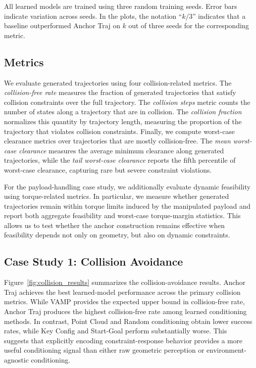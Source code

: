 All learned models are trained using three random training seeds. Error bars indicate variation across seeds. In the plots, the notation ``$k/3$'' indicates that a baseline outperformed Anchor Traj on $k$ out of three seeds for the corresponding metric.

\subsection{Metrics}

We evaluate generated trajectories using four collision-related metrics. The \textit{collision-free rate} measures the fraction of generated trajectories that satisfy collision constraints over the full trajectory. The \textit{collision steps} metric counts the number of states along a trajectory that are in collision. The \textit{collision fraction} normalizes this quantity by trajectory length, measuring the proportion of the trajectory that violates collision constraints. Finally, we compute worst-case clearance metrics over trajectories that are mostly collision-free. The \textit{mean worst-case clearance} measures the average minimum clearance along generated trajectories, while the \textit{tail worst-case clearance} reports the fifth percentile of worst-case clearance, capturing rare but severe constraint violations.

For the payload-handling case study, we additionally evaluate dynamic feasibility using torque-related metrics. In particular, we measure whether generated trajectories remain within torque limits induced by the manipulated payload and report both aggregate feasibility and worst-case torque-margin statistics. This allows us to test whether the anchor construction remains effective when feasibility depends not only on geometry, but also on dynamic constraints.



\subsection{Case Study 1: Collision Avoidance}

Figure~\ref{fig:collision_results} summarizes the collision-avoidance results. Anchor Traj achieves the best learned-model performance across the primary collision metrics. While VAMP provides the expected upper bound in collision-free rate, Anchor Traj produces the highest collision-free rate among learned conditioning methods. In contrast, Point Cloud and Random conditioning obtain lower success rates, while Key Config and Start-Goal perform substantially worse. This suggests that explicitly encoding constraint-response behavior provides a more useful conditioning signal than either raw geometric perception or environment-agnostic conditioning.

